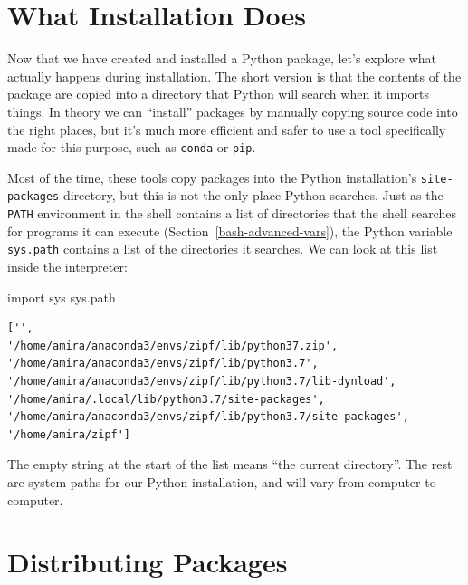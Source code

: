 \documentclass[
]{krantz}
\makeatletter
\newenvironment{Shaded}{\begin{snugshade}}{\end{snugshade}}
\newcommand{\ImportTok}[1]{#1}
\newcommand{\NormalTok}[1]{#1}
\newenvironment{kframe}{%
\medskip{}
\setlength{\fboxsep}{.8em}
 \def\at@end@of@kframe{}%
 \ifinner\ifhmode%
  \def\at@end@of@kframe{\end{minipage}}%
  \begin{minipage}{\columnwidth}%
 \fi\fi%
 \def\FrameCommand##1{\hskip\@totalleftmargin \hskip-\fboxsep
 \colorbox{shadecolor}{##1}\hskip-\fboxsep
     \hskip-\linewidth \hskip-\@totalleftmargin \hskip\columnwidth}%
 \MakeFramed {\advance\hsize-\width
   \@totalleftmargin\z@ \linewidth\hsize
   \@setminipage}}%
 {\par\unskip\endMakeFramed%
 \at@end@of@kframe}
\renewenvironment{Shaded}{\begin{kframe}}{\end{kframe}}
\makeatother
\begin{document}
\hypertarget{packaging-installation}{%
\section{What Installation Does}\label{packaging-installation}}

Now that we have created and installed a Python package,
let's explore what actually happens during installation.
The short version is that
the contents of the package are copied into a directory that Python will search
when it imports things.
In theory we can ``install'' packages by manually copying source code into the right places,
but it's much more efficient and safer to use a tool specifically made for this purpose,
such as \texttt{conda} or \texttt{pip}.

Most of the time,
these tools copy packages into the Python installation's \texttt{site-packages} directory,
but this is not the only place Python searches.
Just as the \texttt{PATH} environment in the shell contains a list of directories
that the shell searches for programs it can execute (Section~\ref{bash-advanced-vars}),
the Python variable \texttt{sys.path} contains a list of the directories it searches.
We can look at this list inside the interpreter:

\begin{Shaded}
\begin{Highlighting}[]
\ImportTok{import}\NormalTok{ sys}
\NormalTok{sys.path}
\end{Highlighting}
\end{Shaded}

\begin{verbatim}
['',
'/home/amira/anaconda3/envs/zipf/lib/python37.zip',
'/home/amira/anaconda3/envs/zipf/lib/python3.7',
'/home/amira/anaconda3/envs/zipf/lib/python3.7/lib-dynload',
'/home/amira/.local/lib/python3.7/site-packages',
'/home/amira/anaconda3/envs/zipf/lib/python3.7/site-packages',
'/home/amira/zipf']
\end{verbatim}

The empty string at the start of the list means ``the current directory''.
The rest are system paths for our Python installation,
and will vary from computer to computer.

\hypertarget{packaging-distribute}{%
\section{Distributing Packages}\label{packaging-distribute}}
\end{document}
